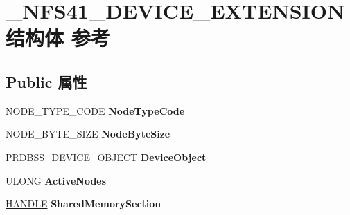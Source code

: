 \hypertarget{struct___n_f_s41___d_e_v_i_c_e___e_x_t_e_n_s_i_o_n}{}\section{\+\_\+\+N\+F\+S41\+\_\+\+D\+E\+V\+I\+C\+E\+\_\+\+E\+X\+T\+E\+N\+S\+I\+O\+N结构体 参考}
\label{struct___n_f_s41___d_e_v_i_c_e___e_x_t_e_n_s_i_o_n}
\subsection*{Public 属性}
\begin{DoxyCompactItemize}
\item 
\mbox{\label{struct___n_f_s41___d_e_v_i_c_e___e_x_t_e_n_s_i_o_n_aefbb26670924a8ab2eb571d25bad8784}} 
N\+O\+D\+E\+\_\+\+T\+Y\+P\+E\+\_\+\+C\+O\+DE {\bfseries Node\+Type\+Code}
\item 
\mbox{\label{struct___n_f_s41___d_e_v_i_c_e___e_x_t_e_n_s_i_o_n_a59e2992f20e843bab403f16c66ae71a5}} 
N\+O\+D\+E\+\_\+\+B\+Y\+T\+E\+\_\+\+S\+I\+ZE {\bfseries Node\+Byte\+Size}
\item 
\mbox{\label{struct___n_f_s41___d_e_v_i_c_e___e_x_t_e_n_s_i_o_n_aa53802feaa531959403bf7945e4b467b}} 
\hyperlink{struct___r_d_b_s_s___d_e_v_i_c_e___o_b_j_e_c_t}{P\+R\+D\+B\+S\+S\+\_\+\+D\+E\+V\+I\+C\+E\+\_\+\+O\+B\+J\+E\+CT} {\bfseries Device\+Object}
\item 
\mbox{\label{struct___n_f_s41___d_e_v_i_c_e___e_x_t_e_n_s_i_o_n_a8873228c04e5991b7548cf8e7924f3de}} 
U\+L\+O\+NG {\bfseries Active\+Nodes}
\item 
\mbox{\label{struct___n_f_s41___d_e_v_i_c_e___e_x_t_e_n_s_i_o_n_a651b352097e0d09fa4a541bd767bb297}} 
\hyperlink{interfacevoid}{H\+A\+N\+D\+LE} {\bfseries Shared\+Memory\+Section}
\item 
\mbox{\label{struct___n_f_s41___d_e_v_i_c_e___e_x_t_e_n_s_i_o_n_a1ae277e641d8b64855739364608b763a}} 

\end{DoxyCompactItemize}

